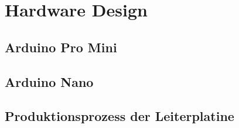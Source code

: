 \section{Hardware Design}
\subsection{Arduino Pro Mini}
\subsection{Arduino Nano}
\subsection{Produktionsprozess der Leiterplatine}
